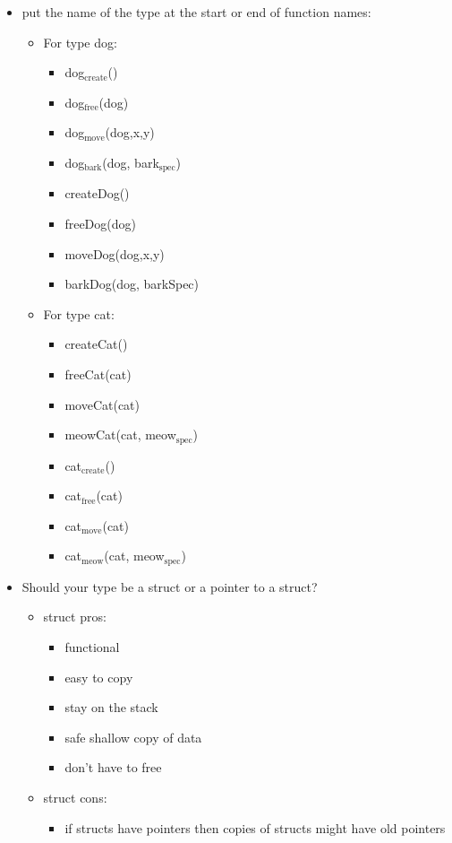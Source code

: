 \documentclass[11pt]{article}
\begin{document}
\begin{itemize}
\item put the name of the type at the start or end of function names:
\begin{itemize}
\item For type dog:
\begin{itemize}
\item dog\(_{\text{create}}\)()
\item dog\(_{\text{free}}\)(dog)
\item dog\(_{\text{move}}\)(dog,x,y)
\item dog\(_{\text{bark}}\)(dog, bark\(_{\text{spec}}\))
\item createDog()
\item freeDog(dog)
\item moveDog(dog,x,y)
\item barkDog(dog, barkSpec)
\end{itemize}
\item For type cat:
\begin{itemize}
\item createCat()
\item freeCat(cat)
\item moveCat(cat)
\item meowCat(cat, meow\(_{\text{spec}}\))
\item cat\(_{\text{create}}\)()
\item cat\(_{\text{free}}\)(cat)
\item cat\(_{\text{move}}\)(cat)
\item cat\(_{\text{meow}}\)(cat, meow\(_{\text{spec}}\))
\end{itemize}
\end{itemize}
\item Should your type be a struct or a pointer to a struct?
\begin{itemize}
\item struct pros:
\begin{itemize}
\item functional
\item easy to copy
\item stay on the stack
\item safe shallow copy of data
\item don't have to free
\end{itemize}
\item struct cons:
\begin{itemize}
\item if structs have pointers then copies of structs might have old pointers

\end{itemize}
\end{itemize}
\end{itemize}
\end{document}
